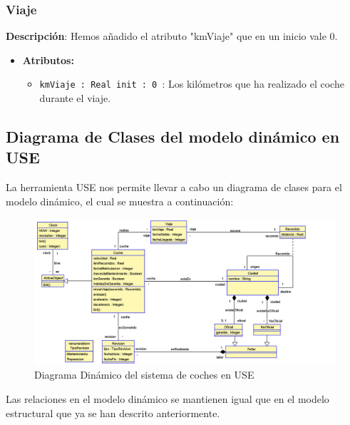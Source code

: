 \documentclass[12pt.a4paper]{article}
\begin{document}
\subsubsection{Viaje}
\textbf{Descripción}:  Hemos añadido el atributo "kmViaje" que en un inicio vale 0.
\begin{itemize}
    \item \textbf{Atributos:}
    \begin{itemize}
        \item \texttt{kmViaje : Real init : 0 }: Los kilómetros que ha realizado el coche durante el viaje.
    \end{itemize}
\end{itemize}

\subsection{Diagrama de Clases del modelo dinámico en USE}
La herramienta USE nos permite llevar a cabo un diagrama de clases para el modelo dinámico, el cual se muestra a continuación:
\begin{figure}[H]
     \includegraphics[width=1\linewidth]{diagramas/USE_B.png}
     \caption{Diagrama Dinámico del sistema de coches en USE}
\end{figure}

Las relaciones en el modelo dinámico se mantienen igual que en el modelo estructural que ya se han descrito anteriormente.
\end{document}
